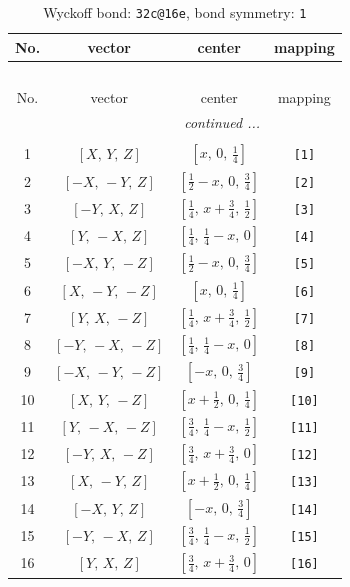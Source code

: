 \documentclass[fleqn,8pt]{jsarticle}
\begin{document}
\begin{longtable}{cccc}
\caption{Wyckoff bond: {\tt 32c@16e}, bond symmetry: {\tt 1}}
 \\
 \hline \hline
No. & vector & center & mapping \\ \hline \endfirsthead

\multicolumn{3}{l}{\tablename\ \thetable{}} \\
 \hline \hline
No. & vector & center & mapping \\ \hline \endhead

 \hline \hline
\multicolumn{3}{r}{\footnotesize\it continued ...} \\ \endfoot

 \hline \hline
\multicolumn{3}{r}{} \\ \endlastfoot

1 & $\left[ X,\, Y,\, Z \right]$ & $\left[ x,\, 0,\, \frac{1}{4} \right]$ & {\tt [1]} \\ \hline
2 & $\left[ - X,\, - Y,\, Z \right]$ & $\left[ \frac{1}{2} - x,\, 0,\, \frac{3}{4} \right]$ & {\tt [2]} \\ \hline
3 & $\left[ - Y,\, X,\, Z \right]$ & $\left[ \frac{1}{4},\, x + \frac{3}{4},\, \frac{1}{2} \right]$ & {\tt [3]} \\ \hline
4 & $\left[ Y,\, - X,\, Z \right]$ & $\left[ \frac{1}{4},\, \frac{1}{4} - x,\, 0 \right]$ & {\tt [4]} \\ \hline
5 & $\left[ - X,\, Y,\, - Z \right]$ & $\left[ \frac{1}{2} - x,\, 0,\, \frac{3}{4} \right]$ & {\tt [5]} \\ \hline
6 & $\left[ X,\, - Y,\, - Z \right]$ & $\left[ x,\, 0,\, \frac{1}{4} \right]$ & {\tt [6]} \\ \hline
7 & $\left[ Y,\, X,\, - Z \right]$ & $\left[ \frac{1}{4},\, x + \frac{3}{4},\, \frac{1}{2} \right]$ & {\tt [7]} \\ \hline
8 & $\left[ - Y,\, - X,\, - Z \right]$ & $\left[ \frac{1}{4},\, \frac{1}{4} - x,\, 0 \right]$ & {\tt [8]} \\ \hline
9 & $\left[ - X,\, - Y,\, - Z \right]$ & $\left[ - x,\, 0,\, \frac{3}{4} \right]$ & {\tt [9]} \\ \hline
10 & $\left[ X,\, Y,\, - Z \right]$ & $\left[ x + \frac{1}{2},\, 0,\, \frac{1}{4} \right]$ & {\tt [10]} \\ \hline
11 & $\left[ Y,\, - X,\, - Z \right]$ & $\left[ \frac{3}{4},\, \frac{1}{4} - x,\, \frac{1}{2} \right]$ & {\tt [11]} \\ \hline
12 & $\left[ - Y,\, X,\, - Z \right]$ & $\left[ \frac{3}{4},\, x + \frac{3}{4},\, 0 \right]$ & {\tt [12]} \\ \hline
13 & $\left[ X,\, - Y,\, Z \right]$ & $\left[ x + \frac{1}{2},\, 0,\, \frac{1}{4} \right]$ & {\tt [13]} \\ \hline
14 & $\left[ - X,\, Y,\, Z \right]$ & $\left[ - x,\, 0,\, \frac{3}{4} \right]$ & {\tt [14]} \\ \hline
15 & $\left[ - Y,\, - X,\, Z \right]$ & $\left[ \frac{3}{4},\, \frac{1}{4} - x,\, \frac{1}{2} \right]$ & {\tt [15]} \\ \hline
16 & $\left[ Y,\, X,\, Z \right]$ & $\left[ \frac{3}{4},\, x + \frac{3}{4},\, 0 \right]$ & {\tt [16]} \\
\end{longtable}
\end{document}
